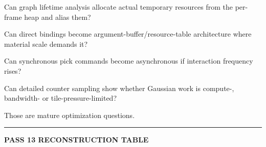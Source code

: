 Can graph lifetime analysis allocate actual temporary resources from the per-frame heap and alias them?

Can direct bindings become argument-buffer/resource-table architecture where material scale demands it?

Can synchronous pick commands become asynchronous if interaction frequency rises?

Can detailed counter sampling show whether Gaussian work is compute-, bandwidth- or tile-pressure-limited?

Those are mature optimization questions.

\begin{center}\rule{0.5\linewidth}{0.5pt}\end{center}

\textbf{PASS 13 RECONSTRUCTION TABLE}

